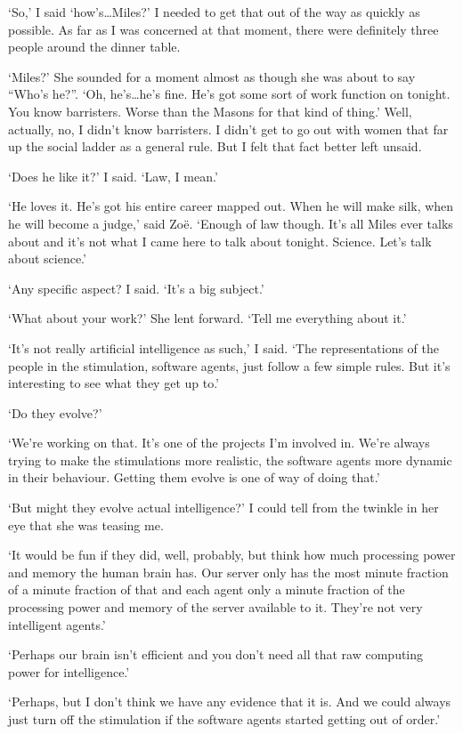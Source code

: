 `So,' I said `how's\dots Miles?' I needed to get that out
of the way as quickly as possible. As far as I was concerned at that
moment, there were definitely three people around the dinner table.

`Miles?' She sounded for a moment almost as though she was about to
say ``Who's he?''. `Oh, he's\dots he's fine. He's got some sort of
work function on tonight. You know barristers. Worse than the Masons
for that kind of thing.' Well, actually, no, I didn't know
barristers. I didn't get to go out with women that far up the social
ladder as a general rule. But I felt that fact better left unsaid.

`Does he like it?' I said. `Law, I mean.'

`He loves it. He's got his entire career mapped out. When he will
make silk, when he will become a judge,' said Zoë. `Enough of
law though. It's all Miles ever talks about and it's not what I came
here to talk about tonight. Science. Let's talk about science.'

`Any specific aspect? I said. `It's a big subject.'

`What about your work?' She lent forward. `Tell me everything about
it.'

`It's not really artificial intelligence as such,' I said. `The
representations of the people in the stimulation, software agents,
just follow a few simple rules. But it's interesting to see what
they get up to.'

`Do they evolve?'

`We're working on that. It's one of the projects I'm involved in.
We're always trying to make the stimulations more realistic, the
software agents more dynamic in their behaviour. Getting them evolve
is one of way of doing that.'

`But might they evolve actual intelligence?' I could tell from the
twinkle in her eye that she was teasing me.

`It would be fun if they did, well, probably, but think how much
processing power and memory the human brain has. Our server only has
the most minute fraction of a minute fraction of that and each agent
only a minute fraction of the processing power and memory of the
server available to it. They're not very intelligent agents.'

`Perhaps our brain isn't efficient and you don't need all that
raw computing power for intelligence.'

`Perhaps, but I don't think we have any evidence that it is. And we
could always just turn off the stimulation if the software agents
started getting out of order.'

